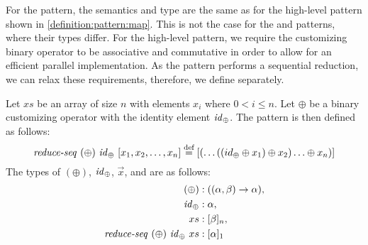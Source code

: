 For the \mapSeq pattern, the semantics and type are the same as for the high-level \map pattern shown in \autoref{definition:pattern:map}.
This is not the case for the \reduceSeq and \reduce patterns, where their types differ.
For the high-level \reduce pattern, we require the customizing binary operator to be associative and commutative in order to allow for an efficient parallel implementation.
As the \reduceSeq pattern performs a sequential reduction, we can relax these requirements, therefore, we define \reduceSeq separately.
\begin{definition}
  \label{definition:pattern:reduceSeq}
  Let $xs$ be an array of size $n$ with elements $x_i$ where $0 < i \leq n$.
  Let $\oplus$ be a binary customizing operator with the identity element $\text{\textit{id}}_\oplus$.
  The \reduceSeq pattern is then defined as follows:
  \begin{equation*}
    \reduceSeq\ (\oplus)\ \id_\oplus\ [x_1, x_2, \dots, x_n]
      \eqdef [(\dots((id_\oplus \oplus x_1) \oplus x_2) \ldots \oplus x_n)]
  \end{equation*}
  The types of $(\oplus)$, $\text{\textit{id}}_\oplus$, $\vec{x}$, and \reduce are as follows:
  \begin{align*}
    (\oplus) &: ((\alpha, \beta) \rightarrow \alpha),\\
    \text{\textit{id}}_\oplus &: \alpha,\\
    xs &: [\beta]_n,\\
    \text{\textit{reduce-seq}}\ (\oplus)\ \text{\textit{id}}_\oplus\ xs &: [\alpha]_1
  \end{align*}
\end{definition}


